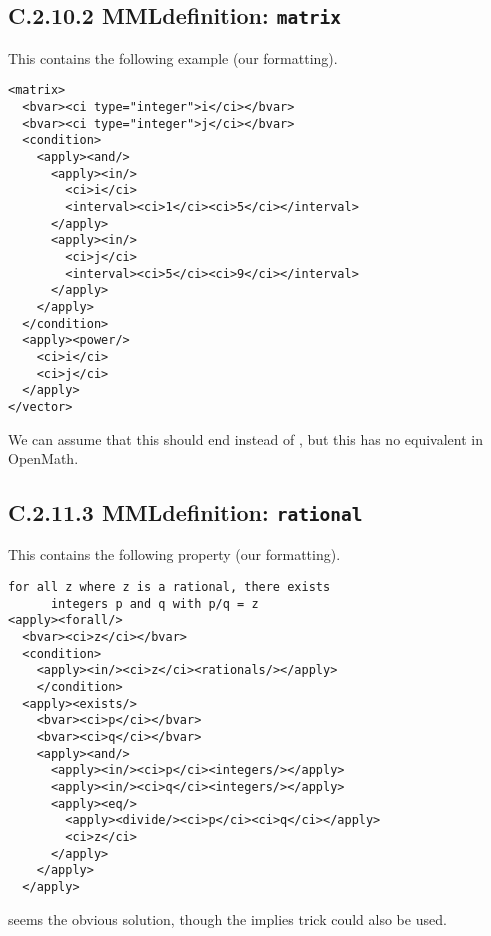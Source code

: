 \documentclass{llncs}
\begin{document}
{\subsection{C.2.10.2 MMLdefinition: {\tt matrix}}\label{C2102}
This contains the following example (our formatting).
\begin{lstlisting}[language=MathML2]
<matrix>
  <bvar><ci type="integer">i</ci></bvar>
  <bvar><ci type="integer">j</ci></bvar>
  <condition>
    <apply><and/>
      <apply><in/>
        <ci>i</ci>
        <interval><ci>1</ci><ci>5</ci></interval>
      </apply>
      <apply><in/>
        <ci>j</ci>
        <interval><ci>5</ci><ci>9</ci></interval>
      </apply>
    </apply>
  </condition>
  <apply><power/>
    <ci>i</ci>
    <ci>j</ci>
  </apply>
</vector>
\end{lstlisting}
We can assume that this should end {} instead of
{}, but this has no equivalent in OpenMath.
\subsection{C.2.11.3 MMLdefinition: {\tt rational}}\label{C2113}
This contains the following property (our formatting).
\begin{lstlisting}[language=MathML2]
    for all z where z is a rational, there exists 
      integers p and q with p/q = z
<apply><forall/>
  <bvar><ci>z</ci></bvar>
  <condition>
    <apply><in/><ci>z</ci><rationals/></apply>
    </condition>
  <apply><exists/>
    <bvar><ci>p</ci></bvar>
    <bvar><ci>q</ci></bvar>
    <apply><and/>
      <apply><in/><ci>p</ci><integers/></apply>
      <apply><in/><ci>q</ci><integers/></apply>
      <apply><eq/>
        <apply><divide/><ci>p</ci><ci>q</ci></apply>
        <ci>z</ci>
      </apply>
    </apply>
  </apply> 
\end{lstlisting}
{} seems the obvious solution, though the implies trick
could also be used.
}
\end{document}
